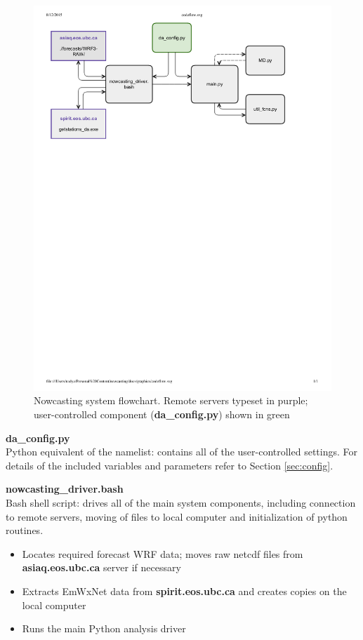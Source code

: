 \documentclass{article}
\begin{document}
\begin{figure}[hb]
\centering
\includegraphics[width=6in]{./graphics/CodeFlowchart.pdf} 
\caption{Nowcasting system flowchart. Remote servers typeset in purple; user-controlled component (\textbf{da\_config.py}) shown in green}\label{fig:flowchart}
\end{figure}
\FloatBarrier


\vspace{0.3cm}
\noindent \textbf{da\_config.py}\\
Python equivalent of the namelist: contains all of the user-controlled settings. For details of the included variables and parameters refer to Section \ref{sec:config}. 

\vspace{0.3cm}
\noindent \textbf{nowcasting\_driver.bash}\\
Bash shell script: drives all of the main system components, including connection to remote servers, moving of files to local computer and initialization of python routines. 
\begin{itemize}[noitemsep]\vspace{-2mm}
	\item Locates required forecast WRF data; moves raw netcdf files from \textbf{asiaq.eos.ubc.ca} server if necessary
	\item Extracts EmWxNet data from \textbf{spirit.eos.ubc.ca} and creates copies on the local computer
	\item Runs the main Python analysis driver
\end{itemize}
\end{document}
